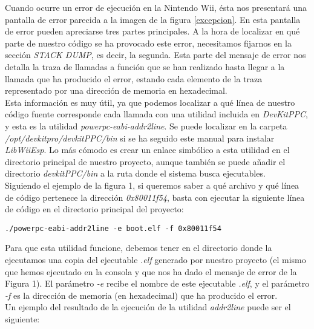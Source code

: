 
Cuando ocurre un error de ejecución en la Nintendo Wii, ésta nos presentará una pantalla de error parecida a la imagen de la figura \ref{excepcion}. En esta pantalla de error pueden apreciarse tres partes principales. A la hora de localizar en qué parte de nuestro código se ha provocado este error, necesitamos fijarnos en la sección \emph{STACK DUMP}, es decir, la segunda. Esta parte del mensaje de error nos detalla la traza de llamadas a función que se han realizado hasta llegar a la llamada que ha producido el error, estando cada elemento de la traza representado por una dirección de memoria en hexadecimal.\\

Esta información es muy útil, ya que podemos localizar a qué línea de nuestro código fuente corresponde cada llamada con una utilidad incluida en \emph{DevKitPPC}, y esta es la utilidad \emph{powerpc-eabi-addr2line}. Se puede localizar en la carpeta \emph{/opt/devkitpro/devkitPPC/bin} si se ha seguido este manual para instalar \emph{LibWiiEsp}. Lo más cómodo es crear un enlace simbólico a esta utilidad en el directorio principal de nuestro proyecto, aunque también se puede añadir el directorio \emph{devkitPPC/bin} a la ruta donde el sistema busca ejecutables.\\

Siguiendo el ejemplo de la figura 1, si queremos saber a qué archivo y qué línea de código pertenece la dirección \emph{0x80011f54}, basta con ejecutar la siguiente línea de código en el directorio principal del proyecto:

\begin{lstlisting}[style=consola]
  ./powerpc-eabi-addr2line -e boot.elf -f 0x80011f54
\end{lstlisting}

Para que esta utilidad funcione, debemos tener en el directorio donde la ejecutamos una copia del ejecutable \emph{.elf} generado por nuestro proyecto (el mismo que hemos ejecutado en la consola y que nos ha dado el mensaje de error de la Figura 1). El parámetro \emph{-e} recibe el nombre de este ejecutable \emph{.elf}, y el parámetro \emph{-f} es la dirección de memoria (en hexadecimal) que ha producido el error.\\

Un ejemplo del resultado de la ejecución de la utilidad \emph{addr2line} puede ser el siguiente:

